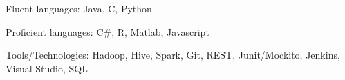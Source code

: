 

\begin{cvhonors}

  \cvhonor
    {Fluent languages:} %
    {Java, C, Python} %
    {} %
    {} %

  \cvhonor
    {Proficient languages:} %
    {C\#, R, Matlab, Javascript} %
    {} %
    {} %
    
  \cvhonor
    {Tools/Technologies:} %
    {Hadoop, Hive, Spark, Git, REST, Junit/Mockito, Jenkins, Visual Studio, SQL} %
    {} %
    {} %

\end{cvhonors}
